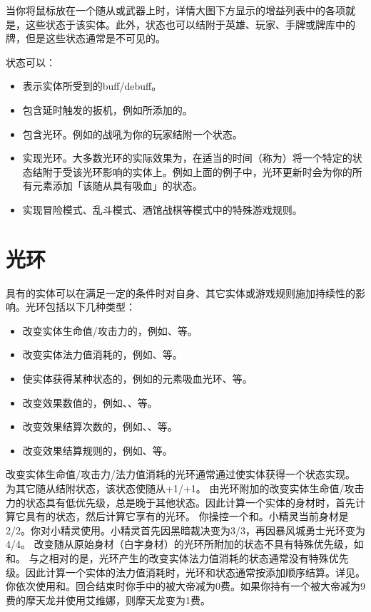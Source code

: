 当你将鼠标放在一个随从或武器上时，详情大图下方显示的增益列表中的各项就是，这些状态于该实体。此外，状态也可以结附于英雄、玩家、手牌或牌库中的牌，但是这些状态通常是不可见的。

状态可以：
\begin{itemize}
    \item 表示实体所受到的buff/debuff。
    \item 包含延时触发的扳机，例如所添加的。
    \item 包含光环。例如的战吼为你的玩家结附一个状态。
    \item 实现光环。大多数光环的实际效果为，在适当的时间（称为）将一个特定的状态结附于受该光环影响的实体上。例如上面的例子中，光环更新时会为你的所有元素添加「该随从具有吸血」的状态。
    \item 实现冒险模式、乱斗模式、酒馆战棋等模式中的特殊游戏规则。
\end{itemize}

\section{光环}
\label{aura}

具有的实体可以在满足一定的条件时对自身、其它实体或游戏规则施加持续性的影响。光环包括以下几种类型：
\begin{itemize}
    \item 改变实体生命值/攻击力的，例如、等。
    \item 改变实体法力值消耗的，例如、等。
    \item 使实体获得某种状态的，例如的元素吸血光环、等。
    \item 改变效果数值的，例如、、等。
    \item 改变效果结算次数的，例如、、等。
    \item 改变效果结算规则的，例如、等。
\end{itemize}

改变实体生命值/攻击力/法力值消耗的光环通常通过使实体获得一个状态实现。
\example {}为其它随从结附状态，该状态使随从+1/+1。
\notice 由光环附加的改变实体生命值/攻击力的状态具有低优先级，总是晚于其他状态。因此计算一个实体的身材时，首先计算它具有的状态，然后计算它享有的光环。
\example 你操控一个和。小精灵当前身材是2/2。你对小精灵使用。小精灵首先因黑暗裁决变为3/3，再因暴风城勇士光环变为4/4。
\exception 改变随从原始身材（白字身材）的光环所附加的状态不具有特殊优先级，如和。
\notice 与之相对的是，光环产生的改变实体法力值消耗的状态通常没有特殊优先级。因此计算一个实体的法力值消耗时，光环和状态通常按添加顺序结算。详见。
\example 你依次使用和。回合结束时你手中的被大帝减为0费。如果你持有一个被大帝减为9费的摩天龙并使用艾维娜，则摩天龙变为1费。

